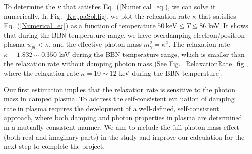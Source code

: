 To determine the $\kappa$ that satisfies Eq.~(\ref{Numerical_eq}), we can solve it numerically. 
In Fig.~\ref{KappaSol.fig}, we plot the relaxation rate $\kappa$ that satisfies Eq.~(\ref{Numerical_eq}) as a function of temperature $50\,\mathrm{keV} \leqslant T\leqslant 86$ keV. It shows that during the BBN temperature range, we have overdamping electron/positron plasma $w_{pl}<\kappa$, and the effective photon mass $m^2_\gamma=\kappa^2$. The relaxation rate $\kappa=1.832\sim0.350$ keV during the BBN temperature range, which is smaller than the relaxation rate without damping photon mass (See Fig.~\ref{RelaxationRate_fig}, where the relaxation rate $\kappa=10\sim12$ keV during the BBN temperature).

Our first estimation implies that the relaxation rate is sensitive to the photon mass in damped plasma. To address the self-consistent evaluation of damping  rate in plasma requires the development of a well-defined, self-consistent approach, where both damping and photon properties in plasma are determined in a mutually consistent manner. We aim to include the full photon mass effect (both real and imaginary parts) in the study and improve our calculation for the next step to complete the project.

